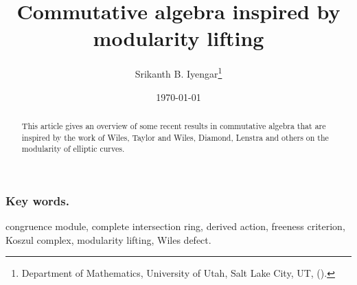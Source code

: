\documentclass[twoside,leqno]{article}
\begin{document}
%

\title{\Large Commutative algebra inspired by modularity lifting}
    
    \author{Srikanth B. Iyengar\thanks{Department of Mathematics, University of Utah, Salt Lake City, UT, ().}}

\date{\today}

\maketitle







\begin{abstract} 
This article gives an overview of some recent results in commutative algebra that are inspired by the work of Wiles, Taylor and Wiles, Diamond, Lenstra and others on the modularity of elliptic curves. 
\end{abstract}

\subsubsection*{Key words.}  congruence module, complete intersection ring, derived action, freeness criterion, Koszul complex, modularity lifting, Wiles defect.
\end{document}
